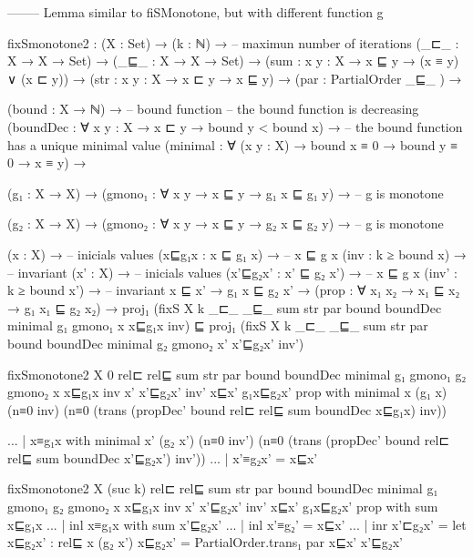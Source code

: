 -------- Lemma similar to fiSMonotone, but with different function g

fixSmonotone2 :  (X : Set) → 
       (k : ℕ) →               -- maximun number of iterations
       (_⊏_ : X → X → Set) →
       (_⊑_ : X → X → Set) → 
       (sum : {x y : X} → x ⊑ y → (x ≡ y) ∨ (x ⊏ y)) →   
       (str : {x y : X} → x ⊏ y → x ⊑ y) → 
       (par : PartialOrder _⊑_ ) → 
       
       (bound : X → ℕ) →                     -- bound function 
       -- the bound function is decreasing 
       (boundDec : ∀ {x y : X} → x ⊏ y → bound y < bound x) →  
       -- the bound function has a unique minimal value
       (minimal : ∀ (x y : X) → bound x ≡ 0 → bound y ≡ 0 → x ≡ y) → 

       (g₁ : X → X) → 
       (gmono₁ : ∀ {x y} → x ⊑ y → g₁ x ⊑ g₁ y) → -- g is monotone

       (g₂ : X → X) → 
       (gmono₂ : ∀ {x y} → x ⊑ y → g₂ x ⊑ g₂ y) → -- g is monotone

       (x : X) →                 -- inicials values   
       (x⊑g₁x : x ⊑ g₁ x) →                    -- x ⊑ g x 
       (inv : k ≥ bound x) →              -- invariant
       (x' : X) →                 -- inicials values   
       (x'⊑g₂x' : x' ⊑ g₂ x') →                    -- x ⊑ g x 
       (inv' : k ≥ bound x') →              -- invariant
       x ⊑ x' → g₁ x ⊑ g₂ x' →
       (prop : ∀ {x₁ x₂} → x₁ ⊑ x₂ → g₁ x₁ ⊑ g₂ x₂) →  
       proj₁ (fixS X k _⊏_ _⊑_ sum str par bound boundDec minimal g₁ gmono₁ x x⊑g₁x inv) ⊑
       proj₁ (fixS X k _⊏_ _⊑_ sum str par bound boundDec minimal g₂ gmono₂ x' x'⊑g₂x' inv')

fixSmonotone2 X 0 rel⊏  rel⊑ sum str par bound boundDec minimal g₁ gmono₁ g₂ gmono₂ x 
         x⊑g₁x inv x' x'⊑g₂x' inv' x⊑x' g₁x⊑g₂x' prop with minimal x (g₁ x) (n≡0 inv)
          (n≡0 (trans (propDec' bound rel⊏ rel⊑ sum boundDec x⊑g₁x) inv))
       
... | x≡g₁x with  minimal x' (g₂ x') (n≡0 inv') (n≡0 (trans (propDec' bound rel⊏ rel⊑ sum boundDec x'⊑g₂x') inv'))
...        | x'≡g₂x' = x⊑x'  

fixSmonotone2 X (suc k) rel⊏  rel⊑ sum str par bound boundDec minimal g₁ gmono₁ g₂ gmono₂ x 
         x⊑g₁x inv x' x'⊑g₂x' inv' x⊑x' g₁x⊑g₂x' prop with sum x⊑g₁x
...  | inl x≡g₁x  with sum x'⊑g₂x'
...              | inl x'≡g₂' = x⊑x'  
...              | inr x'⊏g₂x' = let x⊑g₂x' : rel⊑ x (g₂ x')
                                     x⊑g₂x' = PartialOrder.trans₁ par x⊑x' x'⊑g₂x'

